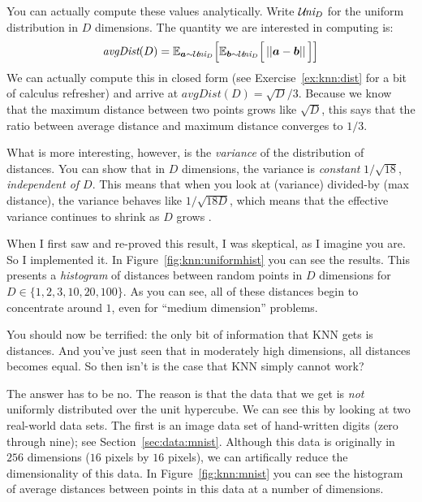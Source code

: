 You can actually compute these values analytically.  Write $\mathcal{U}\hspace{-0.5mm}\textit{ni}_D$ for
the uniform distribution in $D$ dimensions.  The quantity we are
interested in computing is:
\begin{equation} \label{eq:knn:dist}
  \textit{avgDist}(D)
  = \mathbb{E}_{\boldsymbol{a} \sim \mathcal{U}\hspace{-0.5mm}\textit{ni}_D} \Big[
    \mathbb{E}_{\boldsymbol{b} \sim \mathcal{U}\hspace{-0.5mm}\textit{ni}_D} \Big[
      \left\vert\left\vert \boldsymbol{a} - \boldsymbol{b} \right\vert\right\vert
      \Big] \Big]
\end{equation}
We can actually compute this in closed form (see
Exercise~\ref{ex:knn:dist} for a bit of calculus refresher) and arrive
at $\textit{avgDist}(D) = \sqrt D / 3$. Because we know that the maximum distance between two points grows like $\sqrt D$, this says that the ratio between average distance and maximum distance converges to $1/3$. 

What is more interesting, however, is the \emph{variance} of the distribution of distances. You can show that in $D$ dimensions, the variance is \emph{constant} $1/\sqrt{18}$, \emph{independent of $D$}. This means that when you look at (variance) divided-by (max distance), the variance behaves like $1/\sqrt{18 D}$, which means that the effective variance continues to shrink as $D$ grows \cite{brin95nn}.


When I first saw and re-proved this result, I was skeptical, as I
imagine you are.  So I implemented it.  In
Figure~\ref{fig:knn:uniformhist} you can see the results.  This
presents a \emph{histogram} of distances between random points in $D$
dimensions for $D \in \{1,2,3,10,20,100\}$.  As you can see, all of
these distances begin to concentrate around $1$, even for ``medium
dimension'' problems.

You should now be terrified: the only bit of information that KNN gets
is distances.  And you've just seen that in moderately high dimensions,
all distances becomes equal.  So then isn't is the case that KNN
simply cannot work?


The answer has to be no.  The reason is that the data that we get is
\emph{not} uniformly distributed over the unit hypercube.  We can see
this by looking at two real-world data sets.  The first is an image
data set of hand-written digits (zero through nine); see
Section~\ref{sec:data:mnist}.  Although this data is originally in
$256$ dimensions ($16$ pixels by $16$ pixels), we can artifically
reduce the dimensionality of this data.  In Figure~\ref{fig:knn:mnist}
you can see the histogram of average distances between points in this
data at a number of dimensions.

